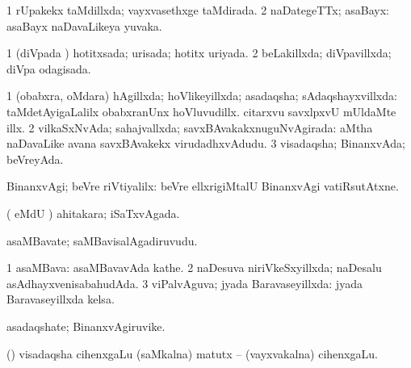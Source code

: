 {{\bentry
{} 
\gl{\gu}
\expl{}
\bmng
\bnum
\num{1} rUpakekx taMdillxda; vayxvasethxge taMdirada. 
\num{2} naDategeTTx; asaBayx:  asaBayx naDavaLikeya yuvaka. 
\enum
\emng
\eentry

\bentry
{} 
\gl{\gu}
\expl{}
\bmng
\bnum
\num{1} (diVpada \vi) hotitxsada; urisada; hotitx uriyada. 
\num{2} beLakillxda; diVpavillxda; diVpa odagisada. 
\enum
\emng
\eentry

\bentry
{} 
\gl{\gu}
\expl{}
\bmng
{} 
\emng
\eentry

\bentry
{} 
\gl{\gu}
\expl{}
\bmng
\bnum
\num{1} (obabxra, oMdara) hAgillxda; hoVlikeyillxda; asadaqsha; sAdaqshayxvillxda:  taMdetAyigaLalilx obabxranUnx hoVluvudillx.  citarxvu savxlpxvU mUldaMte illx. 
\num{2} vilkaSxNvAda; sahajvallxda; savxBAvakakxnuguNvAgirada:  aMtha naDavaLike avana savxBAvakekx virudadhxvAdudu. 
\num{3} visadaqsha; BinanxvAda; beVreyAda. 
\enum
\emng
\eentry

\bentry
{} 
\gl{\upa}
\expl{}
\bmng
BinanxvAgi; beVre riVtiyalilx:  beVre ellxrigiMtalU BinanxvAgi vatiRsutAtxne. 
\emng
\eentry

\bentry
{} 
\gl{\gu}
\expl{}
\bmng
( eMdU \parx) ahitakara; iSaTxvAgada. 
\emng
\eentry

\bentry
{} 
\gl{\nA}
\expl{}
\bmng
asaMBavate; saMBavisalAgadiruvudu. 
\emng
\eentry

\bentry
{} 
\gl{\nA}
\expl{}
\bmng
{} 
\emng
\eentry

\bentry
{} 
\gl{\gu}
\bmng
\bnum
\num{1} asaMBava:  asaMBavavAda kathe. 
\num{2} naDesuva niriVkeSxyillxda; naDesalu asAdhayxvenisabahudAda. 
\num{3} viPalvAguva; jyada Baravaseyillxda:  jyada Baravaseyillxda kelsa. 
\enum
\emng
\eentry

\bentry
{} 
\gl{\nA}
\expl{}
\bmng
asadaqshate; BinanxvAgiruvike. 
\emng
\eentry

\bentry
{}
\gl{\nA}
\expl{}
\bmng
(\ga) visadaqsha cihenxgaLu \eng{[+} (saMkalna) matutx -- (vayxvakalna) cihenxgaLu\eng{]}. 
\emng
\eentry

}}
